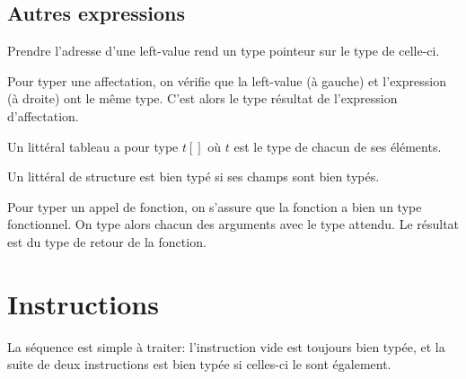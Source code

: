\begin{mathpar}
\end{mathpar}

\subsection*{Autres expressions}

Prendre l'adresse d'une left-value rend un type pointeur sur le type de
celle-ci.

\begin{mathpar}
\end{mathpar}

Pour typer une affectation, on vérifie que la left-value (à gauche) et
l'expression (à droite) ont le même type. C'est alors le type résultat de
l'expression d'affectation.

\begin{mathpar}
\end{mathpar}

Un littéral tableau a pour type $t[]$ où $t$ est le type de chacun de ses
éléments.

\begin{mathpar}
\end{mathpar}

Un littéral de structure est bien typé si ses champs sont bien typés.

\begin{mathpar}
\end{mathpar}

Pour typer un appel de fonction, on s'assure que la fonction a bien un type
fonctionnel. On type alors chacun des arguments avec le type attendu. Le
résultat est du type de retour de la fonction.

\begin{mathpar}
\end{mathpar}

\section{Instructions}

La séquence est simple à traiter: l'instruction vide est toujours bien typée,
et la suite de deux instructions est bien typée si celles-ci le sont également.

\begin{mathpar}

\end{mathpar}

